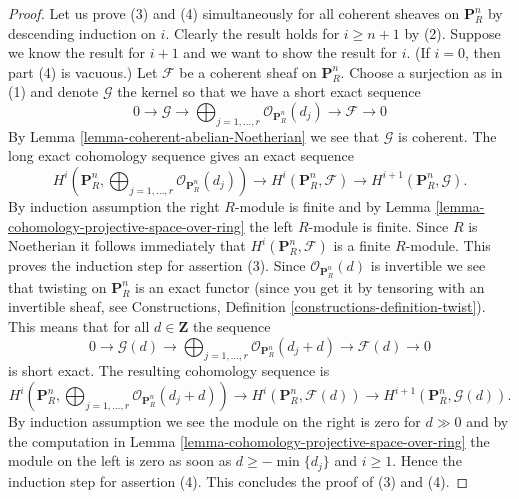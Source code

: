 \begin{proof}
\medskip\noindent
Let us prove (3) and (4) simultaneously for all coherent sheaves
on $\mathbf{P}^n_R$ by descending induction on $i$. Clearly the result
holds for $i \geq n + 1$ by (2). Suppose we know the result for
$i + 1$ and we want to show the result for $i$. (If $i = 0$, then
part (4) is vacuous.) Let $\mathcal{F}$ be a coherent sheaf on
$\mathbf{P}^n_R$. Choose a surjection as in (1) and denote
$\mathcal{G}$ the kernel so that we have a short exact sequence
$$
0 \to \mathcal{G} \to
\bigoplus\nolimits_{j = 1, \ldots, r}
\mathcal{O}_{\mathbf{P}^n_R}(d_j)
\to
\mathcal{F} \to 0
$$
By Lemma \ref{lemma-coherent-abelian-Noetherian}
we see that $\mathcal{G}$ is coherent. The long exact
cohomology sequence gives an exact sequence
$$
H^i(\mathbf{P}^n_R, \bigoplus\nolimits_{j = 1, \ldots, r}
\mathcal{O}_{\mathbf{P}^n_R}(d_j))
\to
H^i(\mathbf{P}^n_R, \mathcal{F})
\to
H^{i + 1}(\mathbf{P}^n_R, \mathcal{G}).
$$
By induction assumption the right $R$-module is finite and by
Lemma \ref{lemma-cohomology-projective-space-over-ring} the left
$R$-module is finite. Since $R$ is Noetherian it follows immediately
that $H^i(\mathbf{P}^n_R, \mathcal{F})$ is a finite $R$-module.
This proves the induction step for assertion (3).
Since $\mathcal{O}_{\mathbf{P}^n_R}(d)$ is invertible
we see that twisting on $\mathbf{P}^n_R$ is an exact functor (since
you get it by tensoring with an invertible sheaf, see
Constructions, Definition \ref{constructions-definition-twist}).
This means that for all $d \in \mathbf{Z}$ the sequence
$$
0 \to \mathcal{G}(d) \to
\bigoplus\nolimits_{j = 1, \ldots, r}
\mathcal{O}_{\mathbf{P}^n_R}(d_j + d)
\to
\mathcal{F}(d) \to 0
$$
is short exact. The resulting cohomology sequence is
$$
H^i(\mathbf{P}^n_R, \bigoplus\nolimits_{j = 1, \ldots, r}
\mathcal{O}_{\mathbf{P}^n_R}(d_j + d))
\to
H^i(\mathbf{P}^n_R, \mathcal{F}(d))
\to
H^{i + 1}(\mathbf{P}^n_R, \mathcal{G}(d)).
$$
By induction assumption we see the module on the right is zero
for $d \gg 0$ and by the computation in
Lemma \ref{lemma-cohomology-projective-space-over-ring}
the module on the left is zero as soon as $d \geq -\min\{d_j\}$
and $i \geq 1$. Hence the induction step for assertion (4).
This concludes the proof of (3) and (4).


\end{proof}
